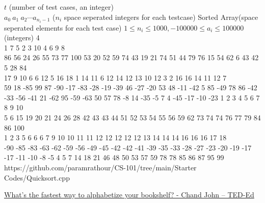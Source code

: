 \documentclass[../../Problems]{subfiles}
\begin{document}
\begin{testcases}
	{$t$ \hfill(number of test cases, an integer)\\
	$a_0\ a_1\ a_2 \cdots a_{n_i-1}$ \hfill($n_i$ space seperated integers for each testcase)}
	{Sorted Array\hfill(space seperated elements for each test case)}
	{$1\leq n_i \leq 1000, -100000\leq a_{i}\leq 100000$\hfill(integers)}
	{4\\
	1 7 5 2 3 10 4 6 9 8\\
	86 56 24 26 55 73 77 100 53 20 52 59 74 43 19 21 74 51 44 79 76 15 54 62 6 43 42 5 28 84\\
	17 9 10 6 6 12 5 16 18 1 14 11 6 12 14 12 13 10 12 3 2 16 16 14 11 12 7\\
	59 18 -85 99 87 -90 -17 -83 -28 -19 -39 46 -27 -20 53 48 -11 -42 5 85 -49 78 86 -42 -33 -56 -41 21 -62 95 -59 -63 50 57 78 -8 14 -35 -5 7 4 -45 -17 -10 -23}
	{1 2 3 4 5 6 7 8 9 10\\
	5 6 15 19 20 21 24 26 28 42 43 43 44 51 52 53 54 55 56 59 62 73 74 74 76 77 79 84 86 100\\
	1 2 3 5 6 6 6 7 9 10 10 11 11 12 12 12 12 12 13 14 14 14 16 16 16 17 18\\
	-90 -85 -83 -63 -62 -59 -56 -49 -45 -42 -42 -41 -39 -35 -33 -28 -27 -23 -20 -19 -17 -17 -11 -10 -8 -5 4 5 7 14 18 21 46 48 50 53 57 59 78 78 85 86 87 95 99}
	{https://github.com/paramrathour/CS-101/tree/main/Starter Codes/Quicksort.cpp}
\end{testcases}
\begin{funvideo}
	\href{https://youtu.be/WaNLJf8xzC4}{What's the fastest way to alphabetize your bookshelf? - Chand John -- TED-Ed}
\end{funvideo}
\recalctypearea
\end{document}

